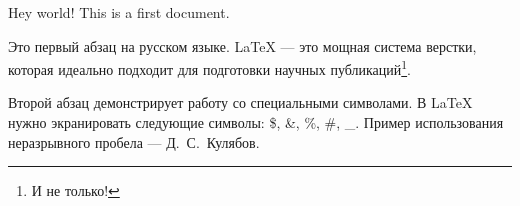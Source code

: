 \documentclass[a4paper,12pt]{article} %
\begin{document}
Hey world!
This is a first document.

Это первый абзац на русском языке. LaTeX --- это мощная система верстки, которая идеально подходит для подготовки научных публикаций\footnote{И не только!}.

Второй абзац демонстрирует работу со специальными символами.
В LaTeX нужно экранировать следующие символы: \$, \&, \%, \#, \_. 
Пример использования неразрывного пробела --- Д.~С.~Кулябов.
\end{document}
